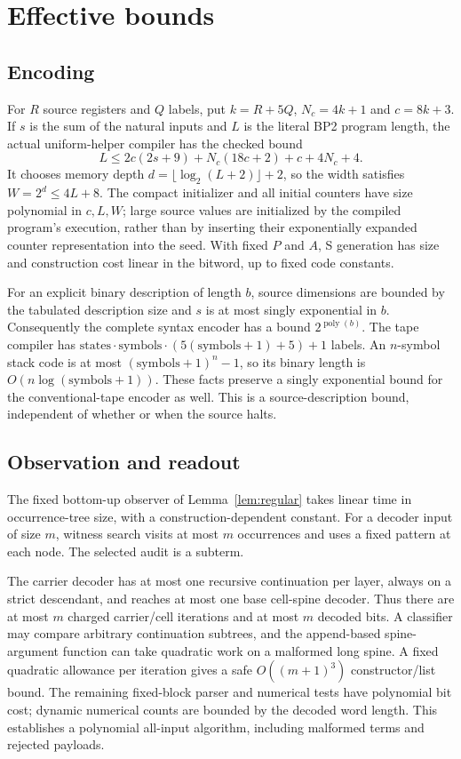 \section{Effective bounds}\label{sec:resources}

\subsection{Encoding}
For $R$ source registers and $Q$ labels, put $k=R+5Q$, $N_c=4k+1$ and $c=8k+3$.
If $s$ is the sum of the natural inputs and $L$ is the literal BP2 program
length, the actual uniform-helper compiler has the checked bound
\[
 L\leq 2c(2s+9)+N_c(18c+2)+c+4N_c+4.
\]
It chooses memory depth $d=\lfloor\log_2(L+2)\rfloor+2$, so the width satisfies
$W=2^d\leq4L+8$. The compact initializer and all initial counters have size
polynomial in $c,L,W$; large source values are initialized by the compiled
program's execution, rather than by inserting their exponentially expanded
counter representation into the seed. With fixed $P$ and $A$, S generation
has size and construction cost linear in the bitword, up to fixed code
constants.

For an explicit binary description of length $b$, source dimensions are bounded
by the tabulated description size and $s$ is at most singly exponential in $b$.
Consequently the complete syntax encoder has a bound $2^{\operatorname{poly}(b)}$.
The tape compiler has
$\mathrm{states}\cdot\mathrm{symbols}\cdot(5(\mathrm{symbols}+1)+5)+1$ labels.
An $n$-symbol stack code is at most $(\mathrm{symbols}+1)^n-1$, so its binary
length is $O(n\log(\mathrm{symbols}+1))$. These facts preserve a singly
exponential bound for the conventional-tape encoder as well. This is a
source-description bound, independent of whether or when the source halts.

\subsection{Observation and readout}
The fixed bottom-up observer of Lemma~\ref{lem:regular} takes linear time in
occurrence-tree size, with a construction-dependent constant.
For a decoder input of size $m$, witness search visits at most $m$ occurrences
and uses a fixed pattern at each node. The selected audit is a subterm.

The carrier decoder has at most one recursive continuation per layer, always
on a strict descendant, and reaches at most one base cell-spine decoder.
Thus there are at most $m$ charged carrier/cell iterations and at most $m$
decoded bits. A classifier may compare arbitrary continuation subtrees, and
the append-based spine-argument function can take quadratic work on a malformed
long spine. A fixed quadratic allowance per iteration gives a safe
$O((m+1)^3)$ constructor/list bound. The remaining fixed-block parser and
numerical tests have polynomial bit cost; dynamic numerical counts are bounded
by the decoded word length. This establishes a polynomial all-input algorithm,
including malformed terms and rejected payloads.

